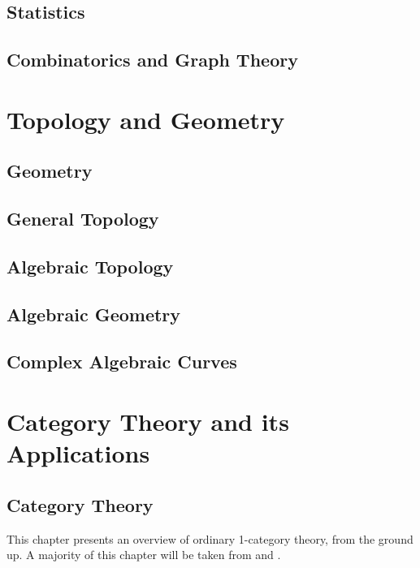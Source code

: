 \documentclass[12pt]{report}
\theoremstyle{definition}
\begin{document}
\chapter{Statistics}\label{cha:statistics}

\chapter{Combinatorics and Graph Theory}\label{cha:comb-graph-theory}


\part{Topology and Geometry}

\chapter{Geometry}\label{cha:geometry}

\chapter{General Topology}\label{cha:general-topology}

\chapter{Algebraic Topology}\label{cha:algebraic-topology}

\chapter{Algebraic Geometry}\label{cha:algebraic-geometry}

\chapter{Complex Algebraic Curves}\label{cha:compl-algebr-curv}



\part{Category Theory and its Applications}\label{part:category-theory-its}

\chapter{Category Theory}\label{cha:category-theory}
This chapter presents an overview of ordinary 1-category theory, from the ground up. A majority of this chapter will be taken from \cite{Leinster:Basic_Category_Theory} and \cite{riehl2016category}.
\end{document}
